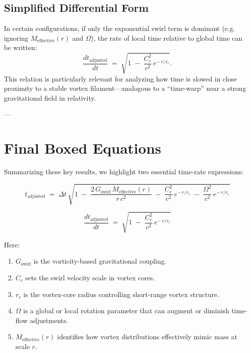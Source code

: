 \documentclass[aps,preprint,superscriptaddress]{revtex4-2}
\begin{document}
    \subsection{Simplified Differential Form}
    In certain configurations, if only the exponential swirl term is dominant (e.g. ignoring \(M_{\text{effective}}(r)\) and \(\Omega\)), the rate of local time relative to global time can be written:
    \[
        \frac{d t_{\text{adjusted}}}{d t}
        \;=\;
        \sqrt{1 \;-\; \frac{C_e^2}{c^2}\, e^{-\,r/r_c}}.
    \]
    This relation is particularly relevant for analyzing how time is slowed in close proximity to a stable vortex filament—analogous to a “time-warp” near a strong gravitational field in relativity.

    ---

    \section{Final Boxed Equations}

    Summarizing these key results, we highlight two essential time-rate expressions:

    \[
        \boxed{
            t_{\text{adjusted}}
            \;=\;
            \Delta t \,\sqrt{
                1
                \;-\; \frac{2\,G_{\text{swirl}}\,M_{\text{effective}}(r)}{r\,c^2}
                \;-\; \frac{C_e^2}{c^2}\, e^{-\,r/r_c}
                \;-\; \frac{\Omega^2}{c^2}\, e^{-\,r/r_c}
            }
        }
    \]

    \[
        \boxed{
            \frac{d t_{\text{adjusted}}}{d t}
            \;=\;
            \sqrt{1 \;-\; \frac{C_e^2}{c^2}\, e^{-\,r/r_c}}
        }
    \]

    Here:
    \begin{enumerate}
        \item \(G_{\text{swirl}}\) is the vorticity-based gravitational coupling.
        \item \(C_e\) sets the swirl velocity scale in vortex cores.
        \item \(r_c\) is the vortex-core radius controlling short-range vortex structure.
        \item \(\Omega\) is a global or local rotation parameter that can augment or diminish time-flow adjustments.
        \item \(M_{\text{effective}}(r)\) identifies how vortex distributions effectively mimic mass at scale \(r\).
    \end{enumerate}
\end{document}
